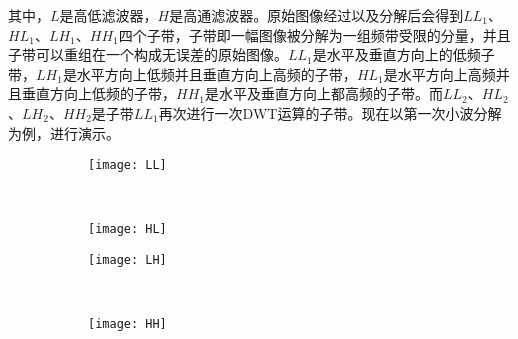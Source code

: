 
其中，$L$是高低滤波器，$H$是高通滤波器。原始图像经过以及分解后会得到$LL_1$、$HL_1$、$LH_1$、$HH_1$四个子带，子带即一幅图像被分解为一组频带受限的分量，并且子带可以重组在一个构成无误差的原始图像。$LL_1$是水平及垂直方向上的低频子带，$LH_1$是水平方向上低频并且垂直方向上高频的子带，$HL_1$是水平方向上高频并且垂直方向上低频的子带，$HH_1$是水平及垂直方向上都高频的子带。而$LL_2$、$HL_2$、$LH_2$、$HH_2$是子带$LL_1$再次进行一次DWT运算的子带。现在以第一次小波分解为例，进行演示。

\begin{figure}[!htbp]
    \centering
    \begin{subfigure}[b]{0.35\textwidth}
      \texttt{[image: LL]}
      \caption{}
      \label{fig:oaspl_a}
    \end{subfigure}%
    ~%
    \begin{subfigure}[b]{0.35\textwidth}
      \texttt{[image: HL]}
      \caption{}
      \label{fig:oaspl_b}
    \end{subfigure}
    \begin{subfigure}[b]{0.35\textwidth}
      \texttt{[image: LH]}
      \caption{}
      \label{fig:oaspl_c}
    \end{subfigure}%
    ~%
    \begin{subfigure}[b]{0.35\textwidth}
      \texttt{[image: HH]}
      \caption{}
      \label{fig:oaspl_d}
    \end{subfigure}
    \label{fig:oaspl}
\end{figure}

